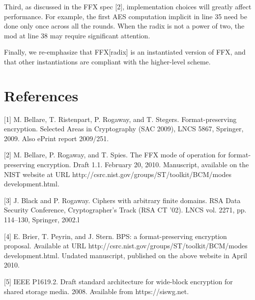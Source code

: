 Third, as discussed in the FFX spec [2], implementation choices will greatly affect performance. For example, the first AES computation implicit in line 35 need be done only once across all the rounds. When the radix is not a power of two, the mod at line 38 may require significant attention.

Finally, we re-emphasize that FFX[radix] is an instantiated version of FFX, and that other instantiations are compliant with the higher-level scheme.

\section{References}
[1] M. Bellare, T. Ristenpart, P. Rogaway, and T. Stegers. Format-preserving encryption. Selected Areas in Cryptography (SAC 2009), LNCS 5867, Springer, 2009. Also ePrint report 2009/251.

[2] M. Bellare, P. Rogaway, and T. Spies. The FFX mode of operation for format-preserving encryption. Draft 1.1. February 20, 2010. Manuscript, available on the NIST website at URL http://csrc.nist.gov/groups/ST/toolkit/BCM/modes development.html.

[3] J. Black and P. Rogaway. Ciphers with arbitrary finite domains. RSA Data Security Conference, Cryptographer’s Track (RSA CT ’02). LNCS vol. 2271, pp. 114–130, Springer, 2002.l

[4] E. Brier, T. Peyrin, and J. Stern. BPS: a format-preserving encryption proposal. Available at URL http://csrc.nist.gov/groups/ST/toolkit/BCM/modes development.html. Undated manuscript, published on the above website in April 2010.

[5] IEEE P1619.2. Draft standard architecture for wide-block encryption for shared storage media. 2008. Available from https://siswg.net.






















